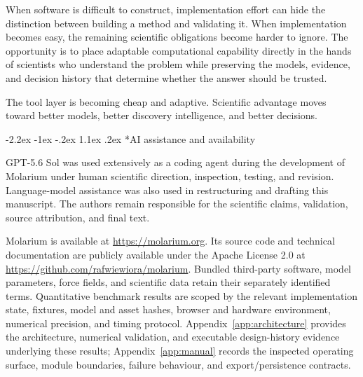 \documentclass[11pt]{article}
\makeatletter
\renewcommand\section{\@startsection{section}{1}{\z@}%
  {-2.2ex \@plus -1ex \@minus -.2ex}%
  {1.1ex \@plus .2ex}%
  {\normalfont\Large\bfseries\color{molblue}}}
\makeatother
\begin{document}
When software is difficult to construct, implementation effort can hide the distinction between building a method and validating it. When implementation becomes easy, the remaining scientific obligations become harder to ignore. The opportunity is to place adaptable computational capability directly in the hands of scientists who understand the problem while preserving the models, evidence, and decision history that determine whether the answer should be trusted.

The tool layer is becoming cheap and adaptive. Scientific advantage moves toward better models, better discovery intelligence, and better decisions.

\section*{AI assistance and availability}

GPT-5.6 Sol was used extensively as a coding agent during the development of Molarium under human scientific direction, inspection, testing, and revision. Language-model assistance was also used in restructuring and drafting this manuscript. The authors remain responsible for the scientific claims, validation, source attribution, and final text.

Molarium is available at \url{https://molarium.org}. Its source code and technical documentation are publicly available under the Apache License 2.0 at \url{https://github.com/rafwiewiora/molarium}. Bundled third-party software, model parameters, force fields, and scientific data retain their separately identified terms. Quantitative benchmark results are scoped by the relevant implementation state, fixtures, model and asset hashes, browser and hardware environment, numerical precision, and timing protocol. Appendix~\ref{app:architecture} provides the architecture, numerical validation, and executable design-history evidence underlying these results; Appendix~\ref{app:manual} records the inspected operating surface, module boundaries, failure behaviour, and export/persistence contracts.

\appendix
\end{document}
